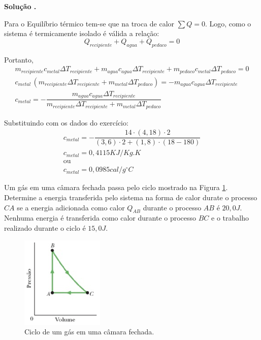 \documentclass[a4paper, 12pt]{article}
\newenvironment{question}[2][Questão]{\begin{trivlist}
\item[\hskip \labelsep {\bfseries #1}\hskip \labelsep {\bfseries #2.}]}{\end{trivlist}}
\newenvironment{solving}[1][\unskip]{%
\vspace{0.2cm}

\noindent\textbf{ Solução #1.}
\vspace{0.1cm}

}
{}
\begin{document}
\begin{solving}
Para o Equilíbrio térmico tem-se que na troca de calor $\sum Q = 0$. Logo, como o sistema é termicamente isolado é válida a relação:
$$Q_{recipiente} + Q_{agua}+Q_{pedaco}=0$$

Portanto, 
\begin{gather*}
m_{recipiente} c_{metal}\Delta T_{recipiente} + m_{agua} c_{agua}\Delta T_{recipiente} + m_{pedaco} c_{metal}\Delta T_{pedaco} = 0\\
 c_{metal}\, (m_{recipiente}\Delta T_{recipiente}+ m_{metal} \Delta T_{pedaco}) = -m_{agua} c_{agua}\Delta T_{recipiente}\\
 c_{metal} = -\dfrac{m_{agua} c_{agua}\Delta T_{recipiente}}{m_{recipiente}\Delta T_{recipiente}+ m_{metal} \Delta T_{pedaco}}
\end{gather*}

Substituindo com os dados do exercício:
\begin{gather*}
c_{metal} = -\dfrac{14\cdot (4,18)\cdot 2}{(3,6)\cdot 2+ (1,8)\cdot (18-180)}\\
c_{metal} = 0,4115KJ/Kg.K\\
\text{ou}\\
c_{metal} = 0,0985cal/g^{\circ}C
\end{gather*}

\end{solving}

\begin{question}{2} 
Um gás em uma câmara fechada passa pelo ciclo mostrado na Figura \ref{fig1}. Determine a energia transferida pelo sistema na forma de calor durate o processo $CA$ se a energia adicionada como calor $Q_{AB}$ durante o processo $AB$ é $20,0J$. Nenhuma energia é transferida como calor durante o processo $BC$ e o trabalho realizado durante o ciclo é $15,0J$.

\begin{figure}[!htb]
\centering
\includegraphics{Q2}
\caption{Ciclo de um gás em uma câmara fechada.}
\label{fig1}
\end{figure}
\end{question}
 
\end{document}
